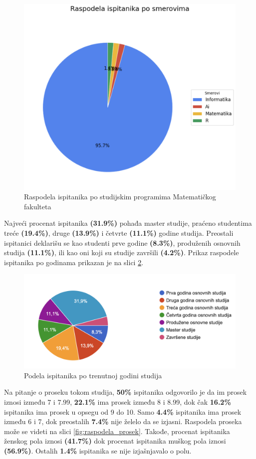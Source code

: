 \documentclass[a4paper]{article}
\begin{document}
{\begin{figure}[H]
    \centering
    \includegraphics[width=0.5\linewidth]{raspodela_ispitanika.png}
    \caption{Raspodela ispitanika po studijskim programima Matematičkog fakulteta}
    \label{fig:raspodela_smerovi}
\end{figure}


Najveći procenat ispitanika \textbf{(31.9\%)} pohađa master studije, praćeno studentima treće \textbf{(19.4\%)}, druge \textbf{(13.9\%)} i četvrte \textbf{(11.1\%)} godine studija. Preostali ispitanici deklarišu se kao studenti prve godine \textbf{(8.3\%)}, produženih osnovnih studija \textbf{(11.1\%)}, ili kao oni koji su studije završili \textbf{(4.2\%)}. Prikaz raspodele ispitanika po godinama prikazan je na slici \ref{fig:raspodela_godine}.

\begin{figure}[H]
    \centering
    \includegraphics[width=0.8\linewidth]{raspodela_godine.png}
    \caption{Podela ispitanika po trenutnoj godini studija}
    \label{fig:raspodela_godine}
\end{figure}


Na pitanje o proseku tokom studija, \textbf{50\%} ispitanika odgovorilo je da im prosek iznosi između 7 i 7.99, \textbf{22.1\%} ima prosek između 8 i 8.99, dok čak \textbf{16.2\%} ispitanika ima prosek u opsegu od 9 do 10. Samo \textbf{4.4\%} ispitanika ima prosek između 6 i 7, dok preostalih \textbf{7.4\%} nije želelo da se izjasni. Raspodela proseka može se videti na slici \ref{fig:raspodela_prosek}. Takođe, procenat ispitanika ženskog pola iznosi \textbf{(41.7\%)} dok procenat ispitanika muškog pola iznosi \textbf{(56.9\%)}. Ostalih \textbf{1.4\%} ispitanika se nije izjašnjavalo o polu.

}
\end{document}

